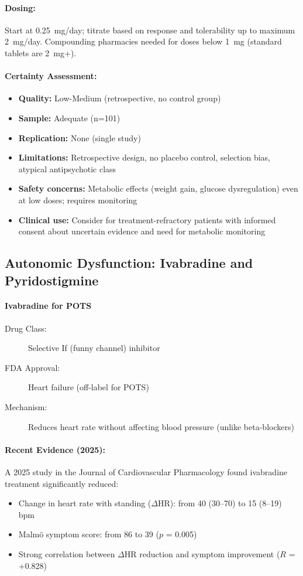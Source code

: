 \paragraph{Dosing:}
Start at 0.25~mg/day; titrate based on response and tolerability up to maximum 2~mg/day. Compounding pharmacies needed for doses below 1~mg (standard tablets are 2~mg+).

\paragraph{Certainty Assessment:}
\begin{itemize}
    \item \textbf{Quality:} Low-Medium (retrospective, no control group)
    \item \textbf{Sample:} Adequate (n=101)
    \item \textbf{Replication:} None (single study)
    \item \textbf{Limitations:} Retrospective design, no placebo control, selection bias, atypical antipsychotic class
    \item \textbf{Safety concerns:} Metabolic effects (weight gain, glucose dysregulation) even at low doses; requires monitoring
    \item \textbf{Clinical use:} Consider for treatment-refractory patients with informed consent about uncertain evidence and need for metabolic monitoring
\end{itemize}

\subsection{Autonomic Dysfunction: Ivabradine and Pyridostigmine}

\paragraph{Ivabradine for POTS}

\begin{description}
    \item[Drug Class:] Selective If (funny channel) inhibitor
    \item[FDA Approval:] Heart failure (off-label for POTS)
    \item[Mechanism:] Reduces heart rate without affecting blood pressure (unlike beta-blockers)
\end{description}

\paragraph{Recent Evidence (2025):}
A 2025 study in the Journal of Cardiovascular Pharmacology found ivabradine treatment significantly reduced:
\begin{itemize}
    \item Change in heart rate with standing ($\Delta$HR): from 40 (30--70) to 15 (8--19) bpm
    \item Malmö symptom score: from 86 to 39 ($p$ = 0.005)
    \item Strong correlation between $\Delta$HR reduction and symptom improvement ($R$ = +0.828)
\end{itemize}

